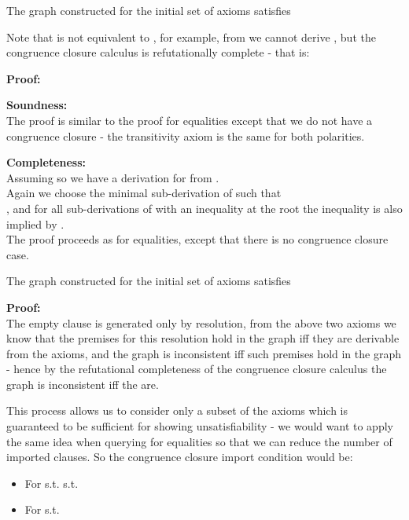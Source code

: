 \begin{theorem}
The graph  constructed for the initial set of axioms  satisfies \\

Note that  is not equivalent to , for example, from  we cannot derive , but the congruence closure calculus is refutationally complete - that is:\\

\noindent
\textbf{Proof:}

\noindent
\textbf{Soundness:}\\
The proof is similar to the proof for equalities except that we do not have a congruence closure - the transitivity axiom is the same for both polarities.

\noindent
\textbf{Completeness:}\\
Assuming  so we have a derivation  for  from .\\
Again we choose the minimal sub-derivation  of  such that\\
 , 
 and for all sub-derivations of  with an inequality at the root the inequality is also implied by .\\
The proof proceeds as for equalities, except that there is no congruence closure case.
\end{theorem}

\begin{theorem}[caption={Refutational Completeness}]
The graph  constructed for the initial set of axioms  satisfies \\

\noindent
\textbf{Proof:}\\
The empty clause is generated only by resolution, from the above two axioms we know that the premises for this resolution hold in the graph iff they are derivable from the axioms, and the graph is inconsistent iff such premises hold in the graph - hence by the refutational completeness of the congruence closure calculus the graph is inconsistent iff the  are.
\end{theorem}

This process allows us to consider only a subset of the axioms which is guaranteed to be sufficient for showing unsatisfiability -  we would want to apply the same idea when querying for equalities so that we can reduce the number of imported clauses.
So the congruence closure import condition would be:
\begin{itemize}
	\item For 
		\subitem {} s.t. 
		\subitem {} s.t. 
	\item For 
		\subitem {} s.t. 
\end{itemize}

